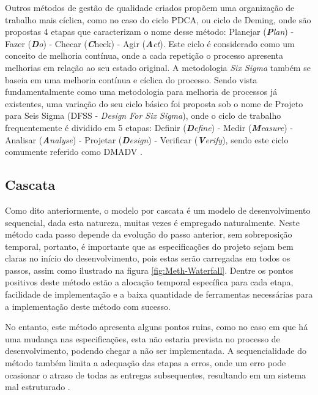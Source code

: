 Outros métodos de gestão de qualidade criados propõem uma organização de trabalho mais cíclica, como no caso do ciclo PDCA, ou ciclo de Deming, onde são propostas 4 etapas
que caracterizam o nome desse método: Planejar (\textit{\textbf{P}lan}) - Fazer (\textit{\textbf{D}o}) - Checar (\textit\textbf{C}heck) - Agir (\textit{\textbf{A}ct}).
Este ciclo é considerado como um conceito de melhoria contínua, onde a cada repetição o processo apresenta melhorias em relação ao seu estado original. A metodologia
\textit{Six Sigma} também se baseia em uma melhoria contínua e cíclica do processo. Sendo vista fundamentalmente como uma metodologia para melhoria de processos
já existentes, uma variação do seu ciclo básico foi proposta sob o nome de Projeto para Seis Sigma (DFSS - \textit{Design For Six Sigma}), onde o ciclo de 
trabalho frequentemente é dividido em 5 etapas: Definir (\textit{\textbf{D}efine}) - Medir (\textit{\textbf{M}easure}) - Analisar (\textit{\textbf{A}nalyse}) -
Projetar (\textit{\textbf{D}esign}) - Verificar (\textit{\textbf{V}erify}), sendo este ciclo comumente referido como DMADV \cite{sokovic2010quality}.

\subsection{Cascata}
Como dito anteriormente, o modelo por cascata é um modelo de desenvolvimento sequencial, dada esta natureza, muitas vezes é empregado naturalmente. Neste método
cada passo depende da evolução do passo anterior, sem sobreposição temporal, portanto, é importante que as especificações do projeto sejam bem claras no início
do desenvolvimento, pois estas serão carregadas em todos os passos, assim como ilustrado na figura \ref{fig:Meth-Waterfall}. Dentre os pontos positivos deste 
método estão a alocação temporal específica para cada etapa, facilidade de implementação e a baixa quantidade de ferramentas necessárias para a implementação deste método com sucesso.

No entanto, este método apresenta alguns pontos ruins, como no caso em que há uma mudança nas especificações, esta não estaria prevista no processo de 
desenvolvimento, podendo chegar a não ser implementada. A sequencialidade do método também limita a adequação das etapas a erros, onde um erro pode ocasionar 
o atraso de todas as entregas subsequentes, resultando em um sistema mal estruturado \cite{balaji2012waterfall}. 

